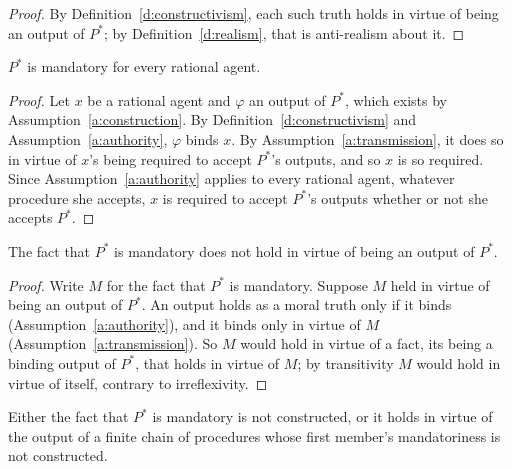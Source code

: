 \documentclass{situationist-preprint}
\begin{document}
\begin{proof}
By Definition~\ref{d:constructivism}, each such truth holds in virtue of being an output of $P^*$; by Definition~\ref{d:realism}, that is anti-realism about it.
\end{proof}

\begin{proposition}[Mandatoriness]\label{p:mandatory}
$P^*$ is mandatory for every rational agent.
\end{proposition}

\begin{proof}
Let $x$ be a rational agent and $\varphi$ an output of $P^*$, which exists by Assumption~\ref{a:construction}. By Definition~\ref{d:constructivism} and Assumption~\ref{a:authority}, $\varphi$ binds $x$. By Assumption~\ref{a:transmission}, it does so in virtue of $x$'s being required to accept $P^*$'s outputs, and so $x$ is so required. Since Assumption~\ref{a:authority} applies to every rational agent, whatever procedure she accepts, $x$ is required to accept $P^*$'s outputs whether or not she accepts $P^*$.
\end{proof}

\begin{lemma}\label{l:self}
The fact that $P^*$ is mandatory does not hold in virtue of being an output of $P^*$.
\end{lemma}

\begin{proof}
Write $M$ for the fact that $P^*$ is mandatory. Suppose $M$ held in virtue of being an output of $P^*$. An output holds as a moral truth only if it binds (Assumption~\ref{a:authority}), and it binds only in virtue of $M$ (Assumption~\ref{a:transmission}). So $M$ would hold in virtue of a fact, its being a binding output of $P^*$, that holds in virtue of $M$; by transitivity $M$ would hold in virtue of itself, contrary to irreflexivity.
\end{proof}

\begin{lemma}\label{l:external}
Either the fact that $P^*$ is mandatory is not constructed, or it holds in virtue of the output of a finite chain of procedures whose first member's mandatoriness is not constructed.
\end{lemma}
\end{document}
